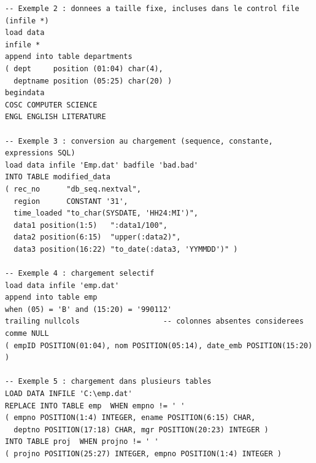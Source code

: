 \documentclass[11pt,a4paper]{article}
\begin{document}
\begin{lstlisting}
-- Exemple 2 : donnees a taille fixe, incluses dans le control file (infile *)
load data
infile *
append into table departments
( dept     position (01:04) char(4),
  deptname position (05:25) char(20) )
begindata
COSC COMPUTER SCIENCE
ENGL ENGLISH LITERATURE

-- Exemple 3 : conversion au chargement (sequence, constante, expressions SQL)
load data infile 'Emp.dat' badfile 'bad.bad'
INTO TABLE modified_data
( rec_no      "db_seq.nextval",
  region      CONSTANT '31',
  time_loaded "to_char(SYSDATE, 'HH24:MI')",
  data1 position(1:5)   ":data1/100",
  data2 position(6:15)  "upper(:data2)",
  data3 position(16:22) "to_date(:data3, 'YYMMDD')" )

-- Exemple 4 : chargement selectif
load data infile 'emp.dat'
append into table emp
when (05) = 'B' and (15:20) = '990112'
trailing nullcols                   -- colonnes absentes considerees comme NULL
( empID POSITION(01:04), nom POSITION(05:14), date_emb POSITION(15:20) )

-- Exemple 5 : chargement dans plusieurs tables
LOAD DATA INFILE 'C:\emp.dat'
REPLACE INTO TABLE emp  WHEN empno != ' '
( empno POSITION(1:4) INTEGER, ename POSITION(6:15) CHAR,
  deptno POSITION(17:18) CHAR, mgr POSITION(20:23) INTEGER )
INTO TABLE proj  WHEN projno != ' '
( projno POSITION(25:27) INTEGER, empno POSITION(1:4) INTEGER )
\end{lstlisting}

\end{document}
